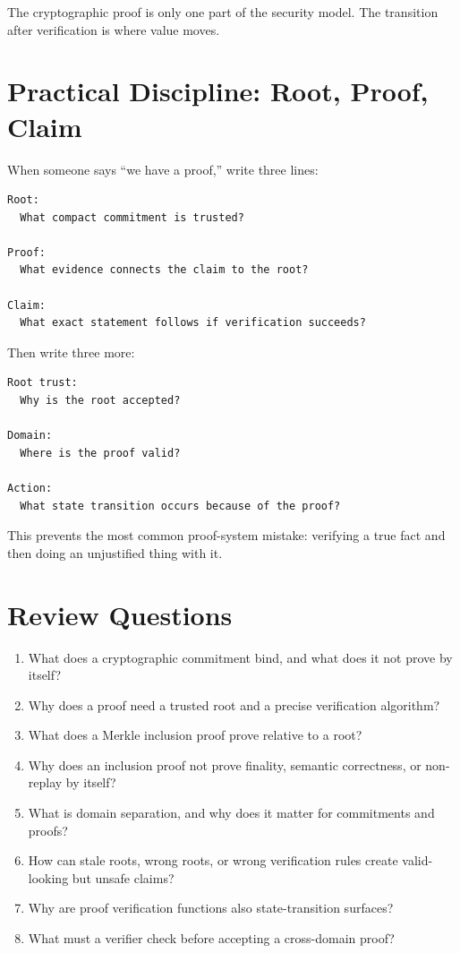 The cryptographic proof is only one part of the security model. The
transition after verification is where value moves.

\section{Practical Discipline: Root, Proof, Claim}

When someone says ``we have a proof,'' write three lines:

\begin{lstlisting}
Root:
  What compact commitment is trusted?

Proof:
  What evidence connects the claim to the root?

Claim:
  What exact statement follows if verification succeeds?
\end{lstlisting}

Then write three more:

\begin{lstlisting}
Root trust:
  Why is the root accepted?

Domain:
  Where is the proof valid?

Action:
  What state transition occurs because of the proof?
\end{lstlisting}

This prevents the most common proof-system mistake: verifying a true
fact and then doing an unjustified thing with it.

\section{Review Questions}

\begin{enumerate}
\def\labelenumi{\arabic{enumi}.}
\tightlist
\item
  What does a cryptographic commitment bind, and what does it not prove by itself?
\item
  Why does a proof need a trusted root and a precise verification algorithm?
\item
  What does a Merkle inclusion proof prove relative to a root?
\item
  Why does an inclusion proof not prove finality, semantic correctness, or non-replay by itself?
\item
  What is domain separation, and why does it matter for commitments and proofs?
\item
  How can stale roots, wrong roots, or wrong verification rules create valid-looking but unsafe claims?
\item
  Why are proof verification functions also state-transition surfaces?
\item
  What must a verifier check before accepting a cross-domain proof?
\end{enumerate}

